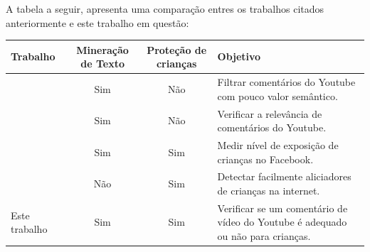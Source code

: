 A tabela a seguir, apresenta uma comparação entres os trabalhos citados anteriormente e este trabalho em questão:
\begin{table}[H]
	{%
		\begin{tabular}{p{3cm}ccp{4.5cm}} %
			\toprule
			Trabalho & Mineração de Texto & Proteção de crianças &  Objetivo\\
			\midrule \midrule
    		\cite{ammari2011filteringYt} & Sim & Não & Filtrar comentários do Youtube com pouco valor semântico.\\
    		\hline	
			\cite{schultes2013leave} & Sim & Não & Verificar a relevância de comentários do Youtube.\\
			\hline
			\cite{marioFalcao2016} & Sim & Sim & Medir nível de exposição de crianças no Facebook.\\
			\hline
			\cite{EnyoGoncalves2017} & Não & Sim & Detectar facilmente aliciadores de crianças na internet.\\
			\hline
			Este trabalho & Sim & Sim & Verificar se um comentário de vídeo do Youtube é adequado ou não para crianças.\\
			\bottomrule
		\end{tabular}%
	}{%
}
\end{table}